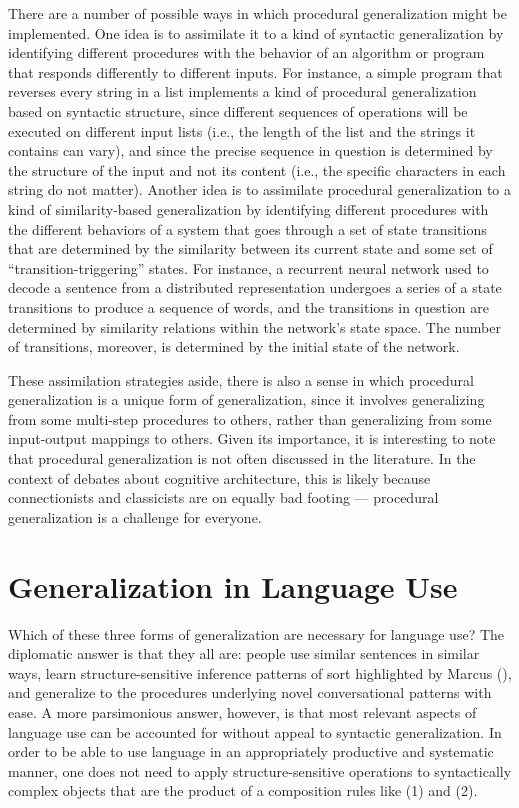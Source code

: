 There are a number of possible ways in which procedural generalization might be implemented. One idea is to assimilate it to a kind of syntactic generalization by identifying different procedures with the behavior of an algorithm or program that responds differently to different inputs. For instance, a simple program that reverses every string in a list implements a kind of procedural generalization based on syntactic structure, since different sequences of operations will be executed on different input lists (i.e., the length of the list and the strings it contains can vary), and since the precise sequence in question is determined by the structure of the input and not its content (i.e., the  specific characters in each string do not matter). Another idea is to assimilate procedural generalization to a kind of similarity-based generalization by identifying different procedures with the different behaviors of a system that goes through a set of state transitions that are determined by the similarity between its current state and some set of ``transition-triggering'' states. For instance, a recurrent neural network used to decode a sentence from a distributed representation undergoes a series of a state transitions to produce a sequence of words, and the transitions in question are determined by similarity relations within the network's state space. The number of transitions, moreover, is determined by the initial state of the network. 

These assimilation strategies aside, there is also a sense in which procedural generalization is a unique form of generalization, since it involves generalizing from some multi-step procedures to others, rather than generalizing from some input-output mappings to others. Given its importance, it is interesting to note that procedural generalization is not often discussed in the literature. In the context of debates about cognitive architecture, this is likely because connectionists and classicists are on equally bad footing --- procedural generalization is a challenge for everyone.

\section{Generalization in Language Use}

Which of these three forms of generalization are necessary for language use? The diplomatic answer is that they all are: people use similar sentences in similar ways, learn structure-sensitive inference patterns of sort highlighted by Marcus (\citeyear{Marcus:1998}), and generalize to the procedures underlying novel conversational patterns with ease. A more parsimonious answer, however, is that most relevant aspects of language use can be accounted for without appeal to syntactic generalization. In order to be able to use language in an appropriately productive and systematic manner, one does not need to apply structure-sensitive operations to syntactically complex objects that are the product of a composition rules like (1) and (2). 

